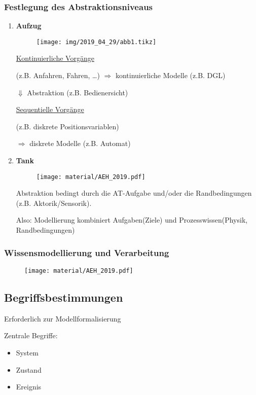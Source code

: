 \subsubsection{Festlegung des Abstraktionsniveaus}
\begin{enumerate}
	\item \textbf{Aufzug}
		\begin{figure}[H]
			\centering
			\texttt{[image: img/2019\_04\_29/abb1.tikz]}
		\end{figure}
		
		\underline{Kontinuierliche Vorgänge}
		
		(z.B. Anfahren, Fahren, \ldots)
		$\Rightarrow$ kontinuierliche Modelle (z.B. DGL)
		
		$\Downarrow$ Abstraktion (z.B. Bedienersicht)
		
		\underline{Sequentielle Vorgänge}
		
		(z.B. diskrete Positionsvariablen)
		
		$\Rightarrow$ diskrete Modelle (z.B. Automat)
	\item \textbf{Tank}
	
		\begin{figure}[H]
			\centering
			\texttt{[image: material/AEH\_2019.pdf]}
		\end{figure}
		
		Abstraktion bedingt durch die AT-Aufgabe und/oder die Randbedingungen (z.B. Aktorik/Sensorik).
		
		Also: Modellierung kombiniert Aufgaben(Ziele) und Prozesswissen(Physik, Randbedingungen)
\end{enumerate}


\subsubsection{Wissensmodellierung und Verarbeitung}
\begin{figure}[H]
	\centering
	\texttt{[image: material/AEH\_2019.pdf]}
\end{figure}

\subsection{Begriffsbestimmungen}
Erforderlich zur Modellformalisierung

Zentrale Begriffe:
\begin{itemize}
	\item System 
	\item Zustand
	\item Ereignis 
\end{itemize}


